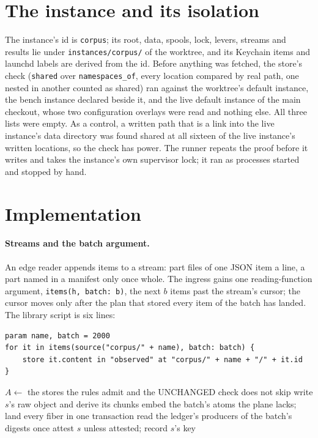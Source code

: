 \documentclass[11pt]{article}
\theoremstyle{plain}
\theoremstyle{definition}
\theoremstyle{remark}
\newcommand{\code}[1]{\texttt{#1}}
\begin{document}
\section{The instance and its isolation}\label{sec:instance}
The instance's id is \code{corpus}; its root, data, spools, lock, levers, streams and results lie
under \code{instances/corpus/} of the worktree, and its Keychain items and launchd labels are derived
from the id. Before anything was fetched, the store's check (\code{shared} over \code{namespaces\_of},
every location compared by real path, one nested in another counted as shared) ran against the
worktree's default instance, the bench instance declared beside it, and the live default instance of
the main checkout, whose two configuration overlays were read and nothing else. All three lists were
empty. As a control, a written path that is a link into the live instance's data directory was found
shared at all sixteen of the live instance's written locations, so the check has power. The runner
repeats the proof before it writes and takes the instance's own supervisor lock; it ran as processes
started and stopped by hand.

\section{Implementation}\label{sec:impl}
\paragraph{Streams and the batch argument.}
An edge reader appends items to a stream: part files of one JSON item a line, a part named in a
manifest only once whole. The ingress gains one reading-function argument, \code{items(h, batch: b)},
the next $b$ items past the stream's cursor; the cursor moves only after the plan that stored every
item of the batch has landed. The library script is six lines:
\begin{verbatim}
param name, batch = 2000
for it in items(source("corpus/" + name), batch: batch) {
    store it.content in "observed" at "corpus/" + name + "/" + it.id
}
\end{verbatim}

\begin{algorithm}
\caption{The staged batch landing (\code{Writer.land\_batch})}
\begin{algorithmic}[1]
\State $A \gets$ the stores the rules admit and the UNCHANGED check does not skip
 write $s$'s raw object and derive its chunks \EndFor
{} embed the batch's atoms the plane lacks; land every fiber in one transaction \EndIf
\State read the ledger's producers of the batch's digests once
 attest $s$ unless attested; record $s$'s key  \EndFor
\end{algorithmic}
\end{algorithm}
\end{document}
